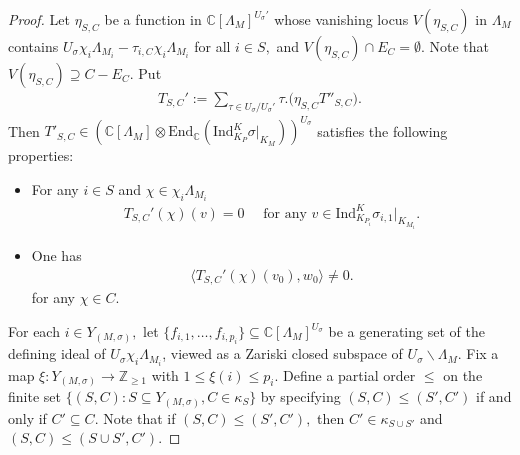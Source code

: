 \documentclass[10pt,a4paper]{amsart}
\newcommand{\CC}{\mathbb{C}}
\newcommand{\Ind}{\mathrm{Ind}}
\newcommand{\ZZ}{\mathbb{Z}}
\begin{document}
\begin{proof}
Let $\eta_{S,C}$ be a function in $\CC[\Lambda_M]^{U_\sigma'}$ whose vanishing locus $V(\eta_{S,C})$ in $\Lambda_M$ contains $U_\sigma \chi_i\Lambda_{M_i}-\tau_{i,C}\chi_i\Lambda_{M_i}$ for all $i\in S,$ and $V(\eta_{S,C})\cap E_C=\emptyset.$ Note that $V(\eta_{S,C})\supseteq C-E_C.$ Put
\begin{align*}
    T_{S,C}':=\sum_{\tau\in U_\sigma/U_{\sigma}'} \tau. \bigg(\eta_{S,C} T''_{S,C}\bigg).
\end{align*}
Then $T'_{S,C}\in \left(\CC[\Lambda_M]\otimes \mathrm{End}_\CC (\Ind_{K_P}^K \sigma|_{K_M})\right)^{U_\sigma}$ satisfies the following properties: 
\begin{itemize}
    \item For any $i\in S$ and $\chi\in \chi_i\Lambda_{M_i}$
\begin{align*}
    T_{S,C}'(\chi)(v)=0\quad\textrm{ for any } v\in \mathrm{Ind}_{K_{P_i}}^{K} \sigma_{i,1}|_{K_{M_i}}.
\end{align*}
    \item One has 
    \begin{align*}
        \langle T_{S,C}'(\chi)(v_0),w_0\rangle\neq 0.
    \end{align*}
    for any $\chi\in C$.
\end{itemize}


 

For each $i\in Y_{(M,\sigma)},$ let $\{f_{i,1},\ldots,f_{i,p_i}\}\subseteq\CC[\Lambda_M]^{U_\sigma}$ be a generating set of the defining ideal of $U_\sigma\chi_i\Lambda_{M_i}$, viewed as a Zariski closed subspace of $U_\sigma\backslash \Lambda_M$. Fix a map $\xi:Y_{(M,\sigma)}\to \ZZ_{\geq 1}$ with $1\leq \xi(i)\leq p_i$. Define a partial order $\le$ on the finite set $\{(S,C): S\subseteq Y_{(M,\sigma)}, C\in \kappa_S\}$ by specifying $(S,C)\le (S',C')$ if and only if $C'\subseteq C$. Note that if $(S,C)\le (S',C'),$ then $C'\in \kappa_{S\cup S'}$ and $(S,C)\le (S\cup S', C').$ 
    

\end{proof}
\end{document}
